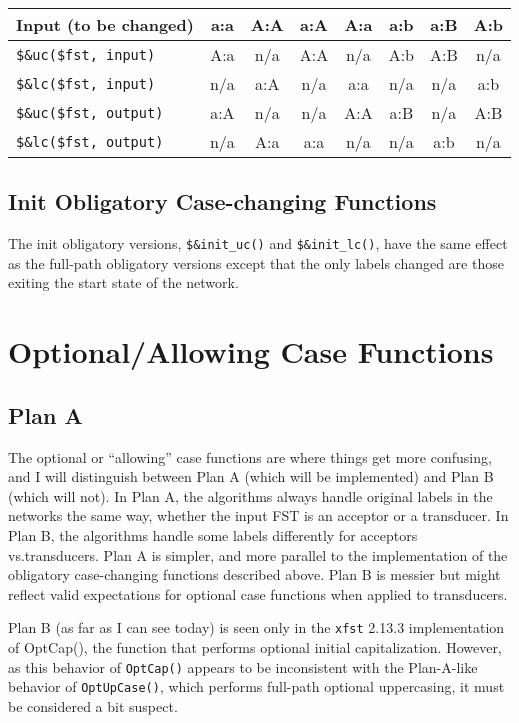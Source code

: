 \documentclass[letterpaper,12pt]{article}
\begin{document}
\vspace{.5cm}
\noindent
\begin{tabular}{|l|c|c|c|c|c|c|c|}
\hline
Input (to be changed)         & a:a & A:A & a:A & A:a & a:b & a:B & A:b \\
\hline
\verb/$&uc($fst, input)/  & A:a & n/a & A:A & n/a & A:b & A:B & n/a \\
\hline
\verb/$&lc($fst, input)/  & n/a & a:A & n/a & a:a & n/a & n/a & a:b \\
\hline
\verb/$&uc($fst, output)/  & a:A & n/a & n/a & A:A & a:B & n/a & A:B \\
\hline
\verb/$&lc($fst, output)/  & n/a & A:a & a:a & n/a & n/a & a:b & n/a \\
\hline
\end{tabular}
\vspace{.5cm}

\subsection{Init Obligatory Case-changing Functions}

The init obligatory versions, \verb!$&init_uc()! and \verb!$&init_lc()!, have the same
effect as the full-path obligatory versions except that the only labels changed are
those exiting the start state of the network.

\section{Optional/Allowing Case Functions}

\subsection{Plan A}

The optional or ``allowing'' case functions are where things get more confusing,
and I will distinguish between Plan A (which will be implemented) and Plan B
(which will not).  In Plan A, the algorithms
always handle original labels in the networks the same way, whether the input FST
is an acceptor or a transducer.  In Plan B, the algorithms handle some
labels differently for acceptors vs.\@ transducers.  Plan A is simpler,
and more parallel to the implementation of the obligatory case-changing
functions described above.  Plan B is messier but might reflect valid
expectations for optional case functions when applied to transducers.  

Plan B (as far as I can see today) is seen only 
in the \texttt{xfst} 2.13.3 implementation of OptCap(), the function that
performs optional initial capitalization.  However, as this behavior of
\texttt{OptCap()} appears to be inconsistent with the Plan-A-like behavior of
\texttt{OptUpCase()}, which performs full-path optional uppercasing, it must be
considered a bit suspect.  
\end{document}
